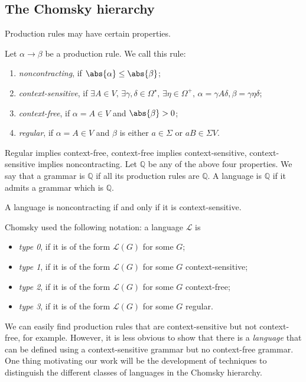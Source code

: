 \subsection{The Chomsky hierarchy}
Production rules may have certain properties.
\begin{definition}
	Let \( \alpha \to \beta \) be a production rule.
	We call this rule:
	\begin{enumerate}
		\item \emph{noncontracting}, if \( \abs{\alpha} \leq \abs{\beta} \);
		\item \emph{context-sensitive}, if \( \exists A \in V,\, \exists \gamma,\delta \in \Omega^\star,\, \exists \eta \in \Omega^+,\, \alpha = \gamma A \delta, \beta = \gamma \eta \delta \);
		\item \emph{context-free}, if \( \alpha = A \in V \) and \( \abs{\beta} > 0 \);
		\item \emph{regular}, if \( \alpha = A \in V \) and \( \beta \) is either \( a \in \Sigma \) or \( aB \in \Sigma V \).
	\end{enumerate}
	Regular implies context-free, context-free implies context-sensitive, context-sensitive implies noncontracting.
	Let \( \mathbb Q \) be any of the above four properties.
	We say that a grammar is \( \mathbb Q \) if all its production rules are \( \mathbb Q \).
	A language is \( \mathbb Q \) if it admits a grammar which is \( \mathbb Q \).
\end{definition}
\begin{theorem}[Chomsky]
	A language is noncontracting if and only if it is context-sensitive.
\end{theorem}
Chomsky used the following notation: a language \( \mathcal L \) is
\begin{itemize}
	\item \emph{type 0}, if it is of the form \( \mathcal L(G) \) for some \( G \);
	\item \emph{type 1}, if it is of the form \( \mathcal L(G) \) for some \( G \) context-sensitive;
	\item \emph{type 2}, if it is of the form \( \mathcal L(G) \) for some \( G \) context-free;
	\item \emph{type 3}, if it is of the form \( \mathcal L(G) \) for some \( G \) regular.
\end{itemize}
We can easily find production rules that are context-sensitive but not context-free, for example.
However, it is less obvious to show that there is a \emph{language} that can be defined using a context-sensitive grammar but no context-free grammar.
One thing motivating our work will be the development of techniques to distinguish the different classes of languages in the Chomsky hierarchy.

